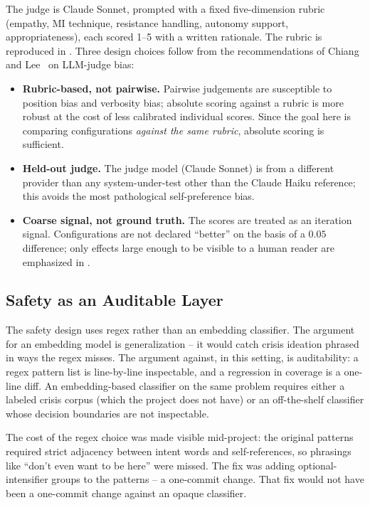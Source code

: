 The judge is Claude Sonnet, prompted with a fixed five-dimension rubric
(empathy, MI technique, resistance handling, autonomy support, appropriateness),
each scored 1--5 with a written rationale. The rubric is reproduced in
. Three design choices follow from the recommendations
of Chiang and Lee~\cite{chiang2023closer} on LLM-judge bias:
\begin{itemize}
    \item \textbf{Rubric-based, not pairwise.} Pairwise judgements are
    susceptible to position bias and verbosity bias; absolute scoring against
    a rubric is more robust at the cost of less calibrated individual scores.
    Since the goal here is comparing configurations \emph{against the same
    rubric}, absolute scoring is sufficient.
    \item \textbf{Held-out judge.} The judge model (Claude Sonnet) is from a
    different provider than any system-under-test other than the Claude Haiku
    reference; this avoids the most pathological self-preference bias.
    \item \textbf{Coarse signal, not ground truth.} The scores are treated as
    an iteration signal. Configurations are not declared ``better'' on the
    basis of a $0.05$ difference; only effects large enough to be visible to
    a human reader are emphasized in .
\end{itemize}

\subsection{Safety as an Auditable Layer}

The safety design uses regex rather than an embedding classifier. The argument
for an embedding model is generalization -- it would catch crisis ideation
phrased in ways the regex misses. The argument against, in this setting, is
auditability: a regex pattern list is line-by-line inspectable, and a regression
in coverage is a one-line diff. An embedding-based classifier on the same
problem requires either a labeled crisis corpus (which the project does not
have) or an off-the-shelf classifier whose decision boundaries are not
inspectable.

The cost of the regex choice was made visible mid-project: the original
patterns required strict adjacency between intent words and self-references,
so phrasings like ``don't even want to be here'' were missed. The fix was
adding optional-intensifier groups to the patterns -- a one-commit change.
That fix would not have been a one-commit change against an opaque classifier.

